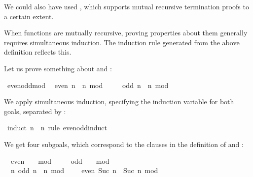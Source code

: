 \begin{isabellebody}
%
\begin{isamarkuptext}%
We could also have used , which
  supports mutual recursive termination proofs to a certain extent.%
\end{isamarkuptext}%
\isamarkuptrue%
%
\isamarkuptrue%
%
\begin{isamarkuptext}%
When functions are mutually recursive, proving properties about them
  generally requires simultaneous induction. The induction rule 
  generated from the above definition reflects this.

  Let us prove something about  and :%
\end{isamarkuptext}%
\isamarkuptrue%
\isamarkupfalse%
\ even{\isacharunderscore}odd{\isacharunderscore}mod{}{\isacharcolon}\isanewline
\ \ {\isachardoublequoteopen}even\ n\ {\isacharequal}\ {\isacharparenleft}n\ mod\ {}\ {\isacharequal}\ {}{\isacharparenright}{\isachardoublequoteclose}\isanewline
\ \ {\isachardoublequoteopen}odd\ n\ {\isacharequal}\ {\isacharparenleft}n\ mod\ {}\ {\isacharequal}\ {}{\isacharparenright}{\isachardoublequoteclose}%
\isadelimproof
%
\endisadelimproof
%
\isatagproof
%
\begin{isamarkuptxt}%
We apply simultaneous induction, specifying the induction variable
  for both goals, separated by :%
\end{isamarkuptxt}%
\isamarkuptrue%
\isamarkupfalse%
\ {\isacharparenleft}induct\ n\ \ n\ rule{\isacharcolon}\ even{\isacharunderscore}odd{\isachardot}induct{\isacharparenright}%
\begin{isamarkuptxt}%
We get four subgoals, which correspond to the clauses in the
  definition of  and :
  \begin{isabelle}%
\ {}{\isachardot}\ even\ {}\ {\isacharequal}\ {\isacharparenleft}{}\ mod\ {}\ {\isacharequal}\ {}{\isacharparenright}\isanewline
\ {}{\isachardot}\ odd\ {}\ {\isacharequal}\ {\isacharparenleft}{}\ mod\ {}\ {\isacharequal}\ {}{\isacharparenright}\isanewline
\ {}{\isachardot}\ {\isasymAnd}n{\isachardot}\ odd\ n\ {\isacharequal}\ {\isacharparenleft}n\ mod\ {}\ {\isacharequal}\ {}{\isacharparenright}\ {\isasymLongrightarrow}\ even\ {\isacharparenleft}Suc\ n{\isacharparenright}\ {\isacharequal}\ {\isacharparenleft}Suc\ n\ mod\ {}\ {\isacharequal}\ {}{\isacharparenright}\isanewline

\end{isabelle}
\end{isamarkuptxt}
\end{isabellebody}
